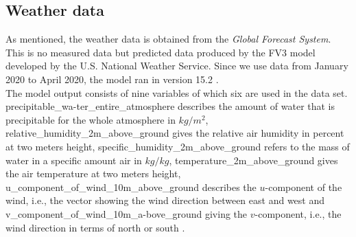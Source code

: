 \documentclass{article}
\begin{document}
\subsection{Weather data}
As mentioned, the weather data is obtained from the \textit{Global Forecast System}. This is no measured data but predicted data produced by the FV3 model developed by the U.S. National Weather Service. Since we use data from January 2020 to April 2020, the model ran in version 15.2  \citep{emc_gfs_17-03-2022}.\\
The model output consists of nine variables of which six are used in the data set.
{\selectfont precipitable\_wa-ter\_entire\_atmosphere} describes the amount of water that is precipitable for the whole atmosphere in $kg/m^2$, {\selectfont relative\_humidity\_2m\_above\_ground} gives the relative air humidity in percent at two meters height, 
{\selectfont specific\_humidity\_2m\_above\_ground} refers to the mass of water in a specific amount air in $kg/kg$, {\selectfont temperature\_2m\_above\_ground} gives the air temperature at two meters height, {\selectfont u\_component\_of\_wind\_10m\_above\_ground} describes the $u$-component of the wind, i.e., the vector showing the wind direction between east and west and {\selectfont v\_component\_of\_wind\_10m\_a-bove\_ground} giving the $v$-component, i.e., the wind direction in terms of north or south \citep{google_gfs_17-03-2022}.
\end{document}

